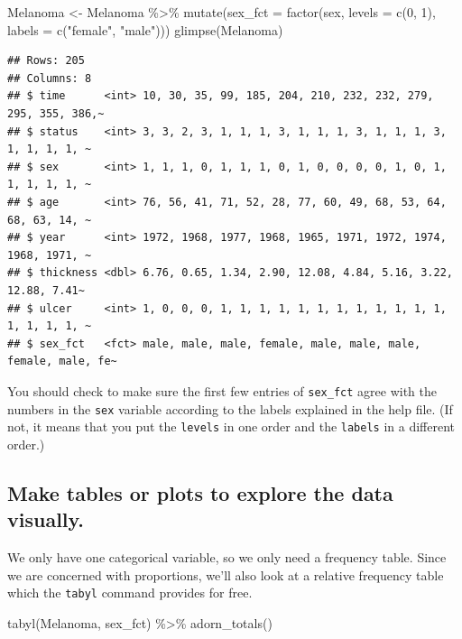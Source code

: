 \documentclass[
]{book}
\newenvironment{Shaded}{\begin{snugshade}}{\end{snugshade}}
\newcommand{\AttributeTok}[1]{\textcolor[rgb]{0.77,0.63,0.00}{#1}}
\newcommand{\DecValTok}[1]{\textcolor[rgb]{0.00,0.00,0.81}{#1}}
\newcommand{\FunctionTok}[1]{\textcolor[rgb]{0.00,0.00,0.00}{#1}}
\newcommand{\NormalTok}[1]{#1}
\newcommand{\OtherTok}[1]{\textcolor[rgb]{0.56,0.35,0.01}{#1}}
\newcommand{\SpecialCharTok}[1]{\textcolor[rgb]{0.00,0.00,0.00}{#1}}
\newcommand{\StringTok}[1]{\textcolor[rgb]{0.31,0.60,0.02}{#1}}
\begin{document}
\begin{Shaded}
\begin{Highlighting}[]
\NormalTok{Melanoma }\OtherTok{\textless{}{-}}\NormalTok{ Melanoma }\SpecialCharTok{\%\textgreater{}\%}
    \FunctionTok{mutate}\NormalTok{(}\AttributeTok{sex\_fct =} \FunctionTok{factor}\NormalTok{(sex, }\AttributeTok{levels =} \FunctionTok{c}\NormalTok{(}\DecValTok{0}\NormalTok{, }\DecValTok{1}\NormalTok{), }\AttributeTok{labels =} \FunctionTok{c}\NormalTok{(}\StringTok{"female"}\NormalTok{, }\StringTok{"male"}\NormalTok{)))}
\FunctionTok{glimpse}\NormalTok{(Melanoma)}
\end{Highlighting}
\end{Shaded}

\begin{verbatim}
## Rows: 205
## Columns: 8
## $ time      <int> 10, 30, 35, 99, 185, 204, 210, 232, 232, 279, 295, 355, 386,~
## $ status    <int> 3, 3, 2, 3, 1, 1, 1, 3, 1, 1, 1, 3, 1, 1, 1, 3, 1, 1, 1, 1, ~
## $ sex       <int> 1, 1, 1, 0, 1, 1, 1, 0, 1, 0, 0, 0, 0, 1, 0, 1, 1, 1, 1, 1, ~
## $ age       <int> 76, 56, 41, 71, 52, 28, 77, 60, 49, 68, 53, 64, 68, 63, 14, ~
## $ year      <int> 1972, 1968, 1977, 1968, 1965, 1971, 1972, 1974, 1968, 1971, ~
## $ thickness <dbl> 6.76, 0.65, 1.34, 2.90, 12.08, 4.84, 5.16, 3.22, 12.88, 7.41~
## $ ulcer     <int> 1, 0, 0, 0, 1, 1, 1, 1, 1, 1, 1, 1, 1, 1, 1, 1, 1, 1, 1, 1, ~
## $ sex_fct   <fct> male, male, male, female, male, male, male, female, male, fe~
\end{verbatim}

You should check to make sure the first few entries of \texttt{sex\_fct} agree with the numbers in the \texttt{sex} variable according to the labels explained in the help file. (If not, it means that you put the \texttt{levels} in one order and the \texttt{labels} in a different order.)

\hypertarget{hypothesis2-ex-plots}{%
\subsection{Make tables or plots to explore the data visually.}\label{hypothesis2-ex-plots}}

We only have one categorical variable, so we only need a frequency table. Since we are concerned with proportions, we'll also look at a relative frequency table which the \texttt{tabyl} command provides for free.

\begin{Shaded}
\begin{Highlighting}[]
\FunctionTok{tabyl}\NormalTok{(Melanoma, sex\_fct) }\SpecialCharTok{\%\textgreater{}\%}
    \FunctionTok{adorn\_totals}\NormalTok{()}
\end{Highlighting}
\end{Shaded}
\end{document}
